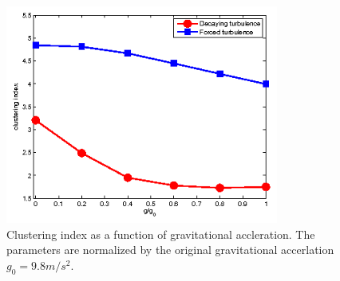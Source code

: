 \documentclass[draft,jgrga]{AGUTeX}
\begin{document}
\begin{article}
\begin{figure}\centering
\includegraphics[width=0.8\textwidth]{Figures/sedwithgravity}
\caption{Clustering index as a function of gravitational accleration. The parameters are normalized by the original gravitational accerlation $g_0 = 9.8m/s^2$.}\label{fig:sed_gravity}
\end{figure}




\end{article}
\end{document}
